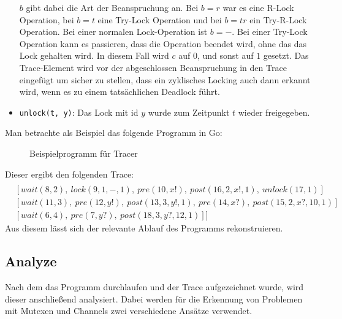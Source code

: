 \begin{itemize}
    $b$ gibt dabei die Art der Beanspruchung an. Bei $b = r$ war es eine R-Lock
    Operation, bei $b = t$ eine Try-Lock Operation und bei $b = tr$ ein Try-R-Lock
    Operation. Bei einer normalen Lock-Operation ist $b = -$. Bei einer 
    Try-Lock Operation kann es passieren, dass die Operation beendet wird, 
    ohne das das Lock gehalten wird. In diesem Fall wird $c$ auf $0$, und 
    sonst auf $1$ gesetzt. Das Trace-Element wird vor der abgeschlossen 
    Beanspruchung in den Trace eingefügt um sicher zu stellen, dass 
    ein zyklisches Locking auch dann erkannt wird, wenn es zu einem 
    tatsächlichen Deadlock führt. 
  \item \texttt{unlock(t, y)}: Das Lock mit id $y$ wurde zum Zeitpunkt 
    $t$ wieder freigegeben. 
\end{itemize}


Man betrachte als Beispiel das folgende Programm in Go:
\begin{figure}
  
  \caption{Beispielprogramm für Tracer}
  \label{Chap:Tracer-Sec:Trace-Fig:Example}
\end{figure}
Dieser ergibt den folgenden Trace:
\begin{align*}
  [&[signal(1, 2),\ signal(2, 3),\ signal(3, 4),\ pre(4, a?, default),\ post(5, default)]\\
  &[wait(8, 2),\ lock(9, 1, -, 1),\ pre(10, x!),\ post(16, 2, x!, 1),\ unlock(17, 1)]\\
  &[wait(11, 3),\ pre(12, y!),\ post(13, 3, y!, 1),\ pre(14, x?),\ post(15, 2, x?, 10, 1)]\\
  &[wait(6, 4),\ pre(7, y?),\ post(18, 3, y?, 12, 1)]]
\end{align*}
Aus diesem lässt sich der relevante Ablauf des Programms rekonstruieren.

\subsection{Analyze}
Nach dem das Programm durchlaufen und der Trace aufgezeichnet wurde, 
wird dieser anschließend analysiert. Dabei werden für die Erkennung von 
Problemen mit Mutexen und Channels zwei verschiedene Ansätze verwendet.

